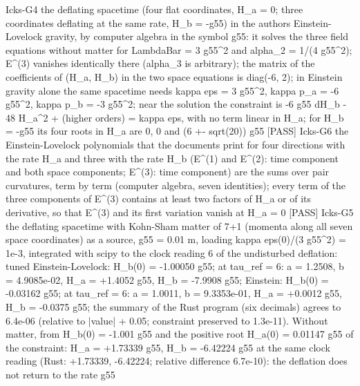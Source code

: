 \documentclass[
  10pt,
]{article}
\newenvironment{Shaded}{}{}
\newcommand{\NormalTok}[1]{#1}
\begin{document}
\begin{Shaded}
\begin{Highlighting}[]
\NormalTok{[PASS] Icks{-}G4  the deflating spacetime (four flat coordinates, H\_a = 0; three coordinates deflating at the same rate, H\_b = {-}g55) in the author\textquotesingle{}s Einstein{-}Lovelock gravity, by computer algebra in the symbol g55: it solves the three field equations without matter for LambdaBar = 3 g55\^{}2 and alpha\_2 = 1/(4 g55\^{}2); E\^{}(3) vanishes identically there (alpha\_3 is arbitrary); the matrix of the coefficients of (H\_a\textquotesingle{}, H\_b\textquotesingle{}) in the two space equations is diag({-}6, 2); in Einstein gravity alone the same spacetime needs kappa eps = 3 g55\^{}2, kappa p\_a = {-}6 g55\^{}2, kappa p\_b = {-}3 g55\^{}2; near the solution the constraint is {-}6 g55 dH\_b {-} 48 H\_a\^{}2 + (higher orders) = kappa eps, with no term linear in H\_a; for H\_b = {-}g55 its four roots in H\_a are 0, 0 and (6 +{-} sqrt(20)) g55}
\NormalTok{[PASS] Icks{-}G6  the Einstein{-}Lovelock polynomials that the documents print for four directions with the rate H\_a and three with the rate H\_b (E\^{}(1) and E\^{}(2): time component and both space components; E\^{}(3): time component) are the sums over pair curvatures, term by term (computer algebra, seven identities); every term of the three components of E\^{}(3) contains at least two factors of H\_a or of its derivative, so that E\^{}(3) and its first variation vanish at H\_a = 0}
\NormalTok{[PASS] Icks{-}G5  the deflating spacetime with Kohn{-}Sham matter of 7+1 (momenta along all seven space coordinates) as a source, g55 = 0.01 m, loading kappa eps(0)/(3 g55\^{}2) = 1e{-}3, integrated with scipy to the clock reading 6 of the undisturbed deflation: tuned Einstein{-}Lovelock: H\_b(0) = {-}1.00050 g55; at tau\_ref = 6: a = 1.2508, b = 4.9085e{-}02, H\_a = +1.4052 g55, H\_b = {-}7.9908 g55; Einstein: H\_b(0) = {-}0.03162 g55; at tau\_ref = 6: a = 1.0011, b = 9.3353e{-}01, H\_a = +0.0012 g55, H\_b = {-}0.0375 g55; the summary of the Rust program (six decimals) agrees to 6.4e{-}06 (relative to |value| + 0.05; constraint preserved to 1.3e{-}11). Without matter, from H\_b(0) = {-}1.001 g55 and the positive root H\_a(0) = 0.01147 g55 of the constraint: H\_a = +1.73339 g55, H\_b = {-}6.42224 g55 at the same clock reading (Rust: +1.73339, {-}6.42224; relative difference 6.7e{-}10): the deflation does not return to the rate g55}

\end{Highlighting}
\end{Shaded}
\end{document}
